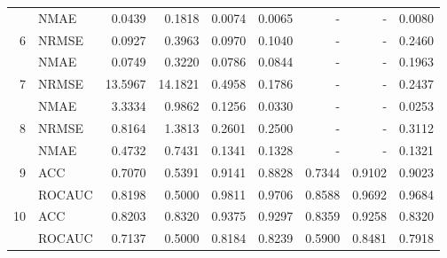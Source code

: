 \begin{table}[]
{\begin{tabular}{@{}llrrrrrrr@{}}
                       & NMAE    & 0.0439                 & 0.1818                  & 0.0074                       & 0.0065                      & -           & -            & 0.0080                     \\
\multicolumn{1}{r}{6}  & NRMSE   & 0.0927                 & 0.3963                  & 0.0970                       & 0.1040                      & -           & -            & 0.2460                     \\
                       & NMAE    & 0.0749                 & 0.3220                  & 0.0786                       & 0.0844                      & -           & -            & 0.1963                     \\
\multicolumn{1}{r}{7}  & NRMSE   & 13.5967                & 14.1821                 & 0.4958                       & 0.1786                      & -           & -            & 0.2437                     \\
                       & NMAE    & 3.3334                 & 0.9862                  & 0.1256                       & 0.0330                      & -           & -            & 0.0253                     \\
\multicolumn{1}{r}{8}  & NRMSE   & 0.8164                 & 1.3813                  & 0.2601                       & 0.2500                      & -           & -            & 0.3112                     \\
                       & NMAE    & 0.4732                 & 0.7431                  & 0.1341                       & 0.1328                      & -           & -            & 0.1321                     \\
\midrule
\multicolumn{1}{r}{9}  & ACC     & 0.7070                 & 0.5391                  & 0.9141                       & 0.8828                      & 0.7344      & 0.9102       & 0.9023                     \\
                       & ROCAUC  & 0.8198                 & 0.5000                  & 0.9811                       & 0.9706                      & 0.8588      & 0.9692       & 0.9684                     \\
\multicolumn{1}{r}{10} & ACC     & 0.8203                 & 0.8320                  & 0.9375                       & 0.9297                      & 0.8359      & 0.9258       & 0.8320                     \\
                       & ROCAUC  & 0.7137                 & 0.5000                  & 0.8184                       & 0.8239                      & 0.5900      & 0.8481       & 0.7918                     \\

\end{tabular}}
\end{table}
